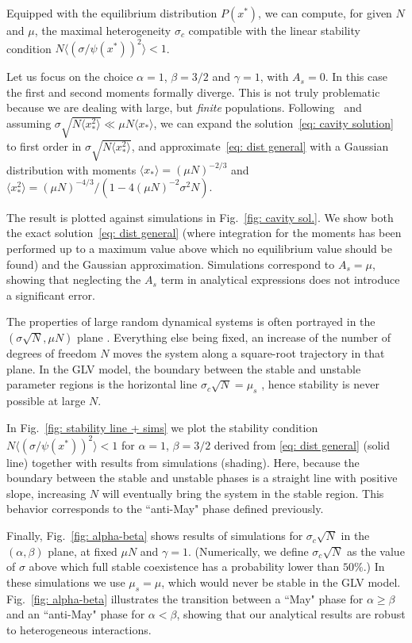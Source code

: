 Equipped with the equilibrium distribution $P(x^*)$, we can compute, for given $N$ and $\mu$, the maximal heterogeneity $\sigma_c$ compatible with the linear stability condition $N\langle (\sigma/\psi(x^*))^2\rangle < 1$. 

Let us focus on the choice $\alpha=1$, $\beta=3/2$ and $\gamma=1$, with $A_s=0$.  
In this case the first and second moments formally diverge.
This is not truly problematic because we are dealing with large, but \emph{finite} populations.
Following~\cite{Cui2020,Hatton2023} and assuming $\sigma \sqrt{N\langle x_*^2\rangle}\ll \mu N \langle x_* \rangle$, we can expand the solution~\eqref{eq: cavity solution} to first order in $\sigma \sqrt{N\langle x_*^2\rangle}$, and approximate~\eqref{eq: dist general} with a Gaussian distribution with moments $\langle x_*\rangle=(\mu N)^{-2/3}$ and $\langle x_*^2\rangle=(\mu N)^{-4/3}/(1-4(\mu N)^{-2}\sigma^2N)$. 

The result is plotted against simulations in Fig.~\ref{fig: cavity sol.}. We show both the exact solution~\eqref{eq: dist general} (where integration for the moments has been performed up to a maximum value above which no equilibrium value should be found) and the Gaussian approximation. Simulations correspond to $A_s=\mu$, showing that neglecting the $A_s$ term in analytical expressions does not introduce a significant error. 


The properties of large random dynamical systems is often portrayed in the $(\sigma \sqrt{N},\mu N)$ plane \cite{bunin2017ecological}. Everything else being fixed, an increase of the number of degrees of freedom $N$ moves the system along a square-root trajectory in that plane. In the GLV model, the boundary between the stable and unstable parameter regions is the horizontal line $\sigma_c\sqrt{N} = \mu_s$ \cite{bunin2017ecological}, hence stability is never possible at large $N$. 

In Fig.~\ref{fig: stability line + sims} we plot the stability condition $N\langle (\sigma/\psi(x^*))^2\rangle < 1$ for $\alpha = 1$, $\beta = 3/2$ derived from \eqref{eq: dist general} (solid line) together with results from simulations (shading). Here, because the boundary between the stable and unstable phases is a straight line with positive slope, increasing $N$ will eventually bring the system in the stable region. This behavior corresponds to the ``anti-May" phase defined previously. 




Finally, Fig.~\ref{fig: alpha-beta} shows results of simulations for $\sigma_c\sqrt{N}$ in the $(\alpha,\beta)$ plane, at fixed $\mu N$ and $\gamma = 1$. (Numerically, we define $\sigma_c\sqrt{N}$ as the value of $\sigma$ above which full stable coexistence has a probability lower than $50\%$.) In these simulations we use $\mu_s = \mu$, which would never be stable in the GLV model. Fig.~\ref{fig: alpha-beta} illustrates the transition between a ``May" phase for $\alpha \geq \beta$ and an ``anti-May" phase for $\alpha < \beta$, showing that our analytical results are robust to heterogeneous interactions.